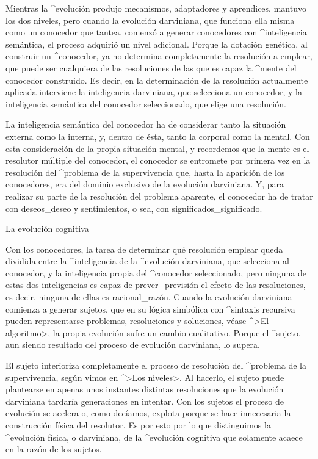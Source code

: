 Mientras la ^{evolución} produjo mecanismos, adaptadores y aprendices,
mantuvo los dos niveles, pero cuando la evolución darviniana, que
funciona ella misma como un conocedor que tantea, comenzó a generar
conocedores con ^{inteligencia} semántica, el proceso adquirió un nivel
adicional. Porque la dotación genética, al construir un ^{conocedor}, ya
no determina completamente la resolución a emplear, que puede ser
cualquiera de las resoluciones de las que es capaz la ^{mente} del
conocedor construido. Es decir, en la determinación de la resolución
actualmente aplicada interviene la inteligencia darviniana, que
selecciona un conocedor, y la inteligencia semántica del conocedor
seleccionado, que elige una resolución.

La inteligencia semántica del conocedor ha de considerar tanto la
situación externa como la interna, y, dentro de ésta, tanto la corporal
como la mental. Con esta consideración de la propia situación mental, y
recordemos que la mente es el resolutor múltiple del conocedor, el
conocedor se entromete por primera vez en la resolución del ^{problema
de la supervivencia} que, hasta la aparición de los conocedores, era del
dominio exclusivo de la evolución darviniana. Y, para realizar su parte
de la resolución del problema aparente, el conocedor ha de tratar con
deseos_{deseo} y sentimientos, o sea, con significados_{significado}.


\Section La evolución cognitiva

Con los conocedores, la tarea de determinar qué resolución emplear queda
dividida entre la ^{inteligencia} de la ^{evolución darviniana}, que
selecciona al conocedor, y la inteligencia propia del ^{conocedor}
seleccionado, pero ninguna de estas dos inteligencias es capaz de
prever_{previsión} el efecto de las resoluciones, es decir, ninguna de
ellas es racional_{razón}. Cuando la evolución darviniana comienza a
generar sujetos, que en su lógica simbólica con ^{sintaxis recursiva}
pueden representarse problemas, resoluciones y soluciones, véase ^>El
algoritmo>, la propia evolución sufre un cambio cualitativo. Porque el
^{sujeto}, aun siendo resultado del proceso de evolución darviniana, lo
supera.

El sujeto interioriza completamente el proceso de resolución del
^{problema de la supervivencia}, según vimos en ^>Los niveles>. Al
hacerlo, el sujeto puede plantearse en apenas unos instantes distintas
resoluciones que la evolución darviniana tardaría generaciones en
intentar. Con los sujetos el proceso de evolución se acelera o, como
decíamos, explota porque se hace innecesaria la construcción física del
resolutor. Es por esto por lo que distinguimos la ^{evolución física}, o
darviniana, de la ^{evolución cognitiva} que solamente acaece en la
razón de los sujetos.

